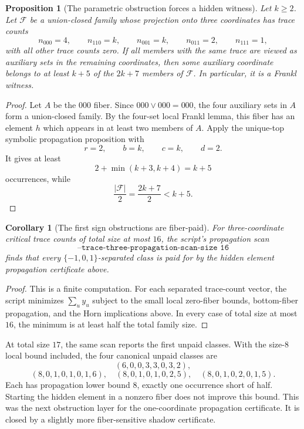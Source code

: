 \documentclass[11pt]{article}
\newtheorem{proposition}{Proposition}
\newtheorem{corollary}{Corollary}
\begin{document}
\begin{proposition}[The parametric obstruction forces a hidden witness]
Let $k\geq2$.
Let $\mathcal{F}$ be a union-closed family whose projection onto three
coordinates has trace counts
\[
  n_{000}=4,\qquad
  n_{110}=k,\qquad
  n_{001}=k,\qquad
  n_{011}=2,\qquad
  n_{111}=1,
\]
with all other trace counts zero.  If all members with the same trace are
viewed as auxiliary sets in the remaining coordinates, then some auxiliary
coordinate belongs to at least $k+5$ of the $2k+7$ members of
$\mathcal{F}$.  In particular, it is a Frankl witness.
\end{proposition}

\begin{proof}
Let $A$ be the $000$ fiber.  Since $000\vee000=000$, the four auxiliary sets
in $A$ form a union-closed family.  By the four-set local Frankl lemma, this
fiber has an element $h$ which appears in at least two members of $A$.
Apply the unique-top symbolic propagation proposition with
\[
  r=2,\qquad b=k,\qquad c=k,\qquad d=2.
\]
It gives at least
\[
  2+\min(k+3,k+4)=k+5
\]
occurrences, while
\[
  \frac{|\mathcal{F}|}{2}=\frac{2k+7}{2}<k+5.
\]
\end{proof}

\begin{corollary}[The first sign obstructions are fiber-paid]
For three-coordinate critical trace counts of total size at most $16$, the
script's propagation scan
\[
  \texttt{--trace-three-propagation-scan-size 16}
\]
finds that every $\{-1,0,1\}$-separated class is paid for by the hidden
element propagation certificate above.
\end{corollary}

\begin{proof}
This is a finite computation.  For each separated trace-count vector, the
script minimizes $\sum_u y_u$ subject to the small local zero-fiber bounds,
bottom-fiber propagation, and the Horn implications above.  In every case of
total size at most $16$, the minimum is at least half the total family size.
\end{proof}

At total size $17$, the same scan reports the first unpaid classes.  With the
size-$8$ local bound included, the four canonical unpaid classes are
\[
  (6,0,0,3,3,0,3,2),
\]
\[
  (8,0,1,0,1,0,1,6),\quad
  (8,0,1,0,1,0,2,5),\quad
  (8,0,1,0,2,0,1,5).
\]
Each has propagation lower bound $8$, exactly one occurrence short of half.
Starting the hidden element in a nonzero fiber does not improve this bound.
This was the next obstruction layer for the one-coordinate propagation
certificate.  It is closed by a slightly more fiber-sensitive shadow
certificate.
\end{document}

